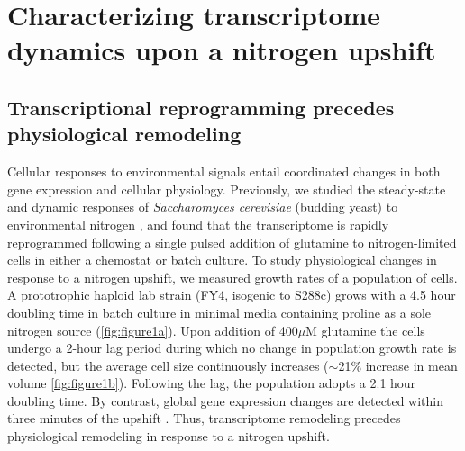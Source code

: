 \section{Characterizing transcriptome dynamics upon a nitrogen upshift}

\subsection{Transcriptional reprogramming precedes physiological remodeling}

Cellular responses to environmental signals entail coordinated changes
in both gene expression and cellular physiology.  Previously, we
studied the steady-state and dynamic responses of 
\textit{Saccharomyces cerevisiae} 
(budding yeast) to environmental nitrogen
\parencite{airoldi2016steady}, and found that the transcriptome is rapidly
reprogrammed following a single pulsed addition of glutamine to
nitrogen-limited cells in either a chemostat or
batch culture. To study physiological changes in response to a
nitrogen upshift, we measured growth rates of a population of 
cells. A prototrophic haploid lab strain 
(FY4, isogenic to S288c) grows with a
4.5 hour doubling time in batch culture in minimal media 
containing proline as a sole
nitrogen source (\autoref{fig:figure1a}). Upon addition of 400$\mu$M glutamine
the cells undergo a 2-hour lag period during which no change in
population growth rate is detected, but the average cell size
continuously increases ($\sim$21\% increase in mean volume 
\autoref{fig:figure1b}). Following the lag, the population adopts a 2.1 
hour doubling time.
By contrast, global gene expression changes are detected
within three minutes of the upshift \parencite{airoldi2016steady}. 
Thus, transcriptome remodeling precedes
physiological remodeling in response to a nitrogen upshift.


